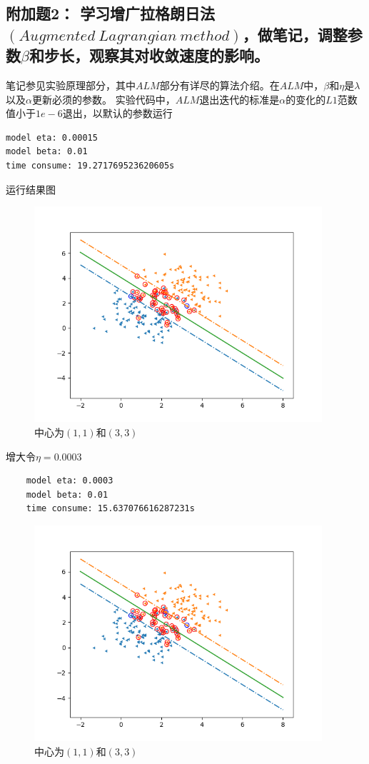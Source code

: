 \documentclass{article}
\begin{document}
\subsection*{\Large 附加题2： \textbf{学习增广拉格朗日法$(Augmented\ Lagrangian\ method)$，做笔记，调整参数$\beta$和步长，观察其对收敛速度的影响。
}}
笔记参见实验原理部分，其中$ALM$部分有详尽的算法介绍。在$ALM$中，$\beta$和$\eta$是$\lambda$以及$\alpha$更新必须的参数。
实验代码中，$ALM$退出迭代的标准是$\alpha$的变化的$L1$范数值小于$1e-6$退出，以默认的参数运行
\begin{verbatim}
model eta: 0.00015
model beta: 0.01
time consume: 19.271769523620605s
\end{verbatim}
运行结果图
\begin{figure}[H]
    \centering
    \begin{minipage}[t]{1.0\linewidth}
        \centering
        \includegraphics[height=8cm]{runtime_1.png}
        \caption{中心为$(1,1)$和$(3,3)$}
    \end{minipage}
 \end{figure}
 增大令$\eta=0.0003$
 \begin{verbatim}
    model eta: 0.0003
    model beta: 0.01
    time consume: 15.637076616287231s
    \end{verbatim}
\begin{figure}[H]
        \centering
        \begin{minipage}[t]{1.0\linewidth}
            \centering
            \includegraphics[height=8cm]{runtime_2.png}
            \caption{中心为$(1,1)$和$(3,3)$}
        \end{minipage}
     \end{figure}
     
\end{document}
